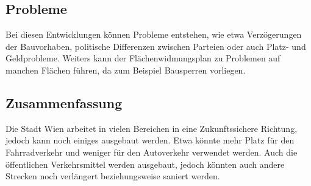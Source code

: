 \subsection{Probleme}

Bei diesen Entwicklungen können Probleme entstehen, wie etwa Verzögerungen der Bauvorhaben, politische Differenzen zwischen Parteien oder auch Platz- und Geldprobleme. Weiters kann der Flächenwidmungsplan zu Problemen auf manchen Flächen führen, da zum Beispiel Bausperren vorliegen.

\subsection{Zusammenfassung}

Die Stadt Wien arbeitet in vielen Bereichen in eine Zukunftssichere Richtung, jedoch kann noch einiges ausgebaut werden. Etwa könnte mehr Platz für den Fahrradverkehr und weniger für den Autoverkehr verwendet werden. Auch die öffentlichen Verkehrsmittel werden ausgebaut, jedoch könnten auch andere Strecken noch verlängert beziehungsweise saniert werden.
